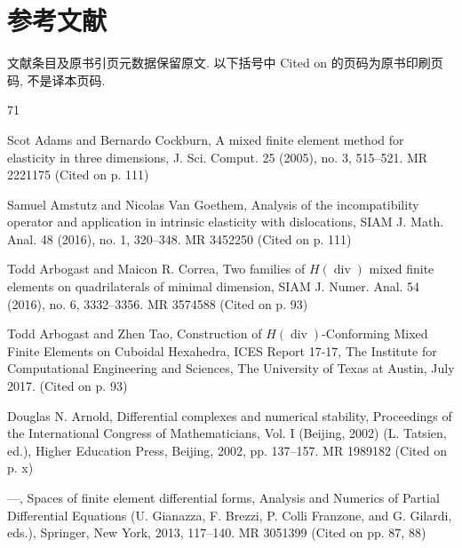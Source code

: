 \clearpage\chapter*{{参考文献}}\label{back:bibliography}
{文献条目及原书引页元数据保留原文. 以下括号中 Cited on 的页码为原书印刷页码, 不是译本页码.}
\begin{MBSourceBibliography}{71}

\item\label{bib:source-1}Scot Adams and Bernardo Cockburn, A mixed finite element method for elasticity in three dimensions, J. Sci. Comput. 25 (2005), no. 3, 515–521. MR 2221175 (Cited on p. 111)

\item\label{bib:source-2}Samuel Amstutz and Nicolas Van Goethem, Analysis of the incompatibility operator and application in intrinsic elasticity with dislocations, SIAM J. Math. Anal. 48 (2016), no. 1, 320–348. MR 3452250 (Cited on p. 111)

\item\label{bib:source-3}Todd Arbogast and Maicon R. Correa, Two families of $H(\operatorname{div})$ mixed finite elements on quadrilaterals of minimal dimension, SIAM J. Numer. Anal. 54 (2016), no. 6, 3332–3356. MR 3574588 (Cited on p. 93)

\item\label{bib:source-4}Todd Arbogast and Zhen Tao, Construction of $H(\operatorname{div})$-Conforming Mixed Finite Elements on Cuboidal Hexahedra, ICES Report 17-17, The Institute for Computational Engineering and Sciences, The University of Texas at Austin, July 2017. (Cited on p. 93)

\item\label{bib:source-5}Douglas N. Arnold, Differential complexes and numerical stability, Proceedings of the International Congress of Mathematicians, Vol. I (Beijing, 2002) (L. Tatsien, ed.), Higher Education Press, Beijing, 2002, pp. 137–157. MR 1989182 (Cited on p. x)

\item\label{bib:source-6}—, Spaces of finite element differential forms, Analysis and Numerics of Partial Differential Equations (U. Gianazza, F. Brezzi, P. Colli Franzone, and G. Gilardi, eds.), Springer, New York, 2013, 117–140. MR 3051399 (Cited on pp. 87, 88)


\end{MBSourceBibliography}
